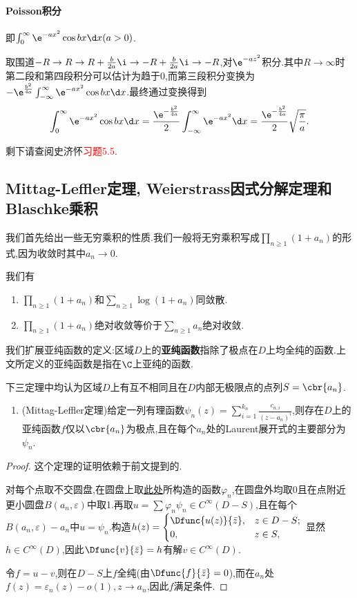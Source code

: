 \documentclass{article}
\newcommand{\exerfunc}[1]{剩下请查阅史济怀\textcolor{red}{习题#1}.}
\begin{document}
\paragraph{Poisson积分}即$\int_0^\infty \e^{-ax^2}\cos bx \d x(a>0)$.

取围道$-R\to R\to R+\frac{b}{2a}\i\to -R+\frac{b}{2a}\i\to -R$,对$\e^{-az^2}$积分.其中$R\to \infty$时第二段和第四段积分可以估计为趋于0,而第三段积分变换为$-\e^{\frac{b^2}{4a}}\int_{-\infty}^{\infty}\e^{-ax^2}\cos bx\d x$.最终通过变换得到
$$\int_{0}^{\infty}\e^{-ax^2}\cos bx\d x=\frac{\e^{-\frac{b^2}{4a}}}{2}\int_{-\infty}^{\infty}\e^{-ax^2}\d x=\frac{\e^{-\frac{b^2}{4a}}}{2}\sqrt{\frac{\pi}{a}}.$$

\exerfunc{5.5}

\subsection{Mittag-Leffler定理, Weierstrass因式分解定理和Blaschke乘积}
我们首先给出一些无穷乘积的性质.我们一般将无穷乘积写成$\prod_{n\geq 1}(1+a_n)$的形式,因为收敛时其中$a_n\to 0$.

我们有\begin{enumerate}
    \item $\prod_{n\geq 1}(1+a_n)$和$\sum_{n\geq 1}\log(1+a_n)$同敛散.
    \item $\prod_{n\geq 1}(1+a_n)$绝对收敛等价于$\sum_{n\geq 1}a_n$绝对收敛.
\end{enumerate}

我们扩展亚纯函数的定义:区域$D$上的\textbf{亚纯函数}指除了极点在$D$上均全纯的函数.上文所定义的亚纯函数是指在$\C$上亚纯的函数.

下三定理中均认为区域$D$上有互不相同且在$D$内部无极限点的点列$S=\cbr{a_n}$.
\begin{enumerate}[resume]
    \item (Mittag-Leffler定理)给定一列有理函数$\psi_n(z)=\sum_{i=1}^{k_n}\frac{c_{n,i}}{(z-a_n)^i}$,则存在$D$上的亚纯函数$f$仅以$\cbr{a_n}$为极点,且在每个$a_n$处的Laurent展开式的主要部分为$\psi_n$.
\end{enumerate}
\begin{proof}
    这个定理的证明依赖于前文提到的.
    
    对每个点取不交圆盘,在圆盘上取\hyperlink{dbar-func}{此处}所构造的函数$\varphi_n$,在圆盘外均取0且在点附近更小圆盘$B(a_n,\varepsilon)$中取1.再取$u=\sum\varphi_n\psi_n\in C^\infty(D-S)$,且在每个$B(a_n,\varepsilon)-a_n$中$u=\psi_n$.构造$h(z)=\begin{cases}
        \Dfunc{u(z)}{\bar{z}},&z\in D-S;\\0,&z\in S,
    \end{cases}$
    显然$h\in C^\infty(D)$,因此$\Dfunc{v}{\bar{z}}=h$有解$v\in C^\infty(D)$.

    令$f=u-v$,则在$D-S$上$f$全纯(由$\Dfunc{f}{\bar{z}}=0$),而在$a_n$处$f(z)=\varepsilon_n(z)-o(1),z\to a_n$,因此$f$满足条件.
\end{proof}
\end{document}
